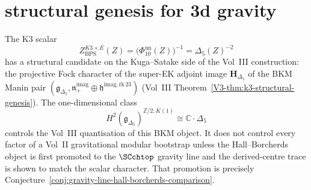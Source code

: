 \section{structural genesis for 3d gravity}
\label{sec:3dg-gelfand-supplement}

\begin{remark}
\label{rem:3dg-gelfand-phi-ek-adjoint}
The K3 scalar
\[
Z_{\mathrm{BPS}}^{K3\times E}(Z)=\bigl(\Phi_{10}^{\mathrm{un}}(Z)\bigr)^{-1}
=\Delta_5(Z)^{-2}
\]
has a structural candidate on the Kuga--Satake side of the Vol~III
construction: the projective Fock character of the super-EK adjoint
image \(\mathbf H_{\Delta_5}\) of the BKM Manin pair
\((\mathfrak{g}_{\Delta_5},
\mathfrak{n}_+^{\mathrm{imag}}\oplus
\mathfrak{h}^{\mathrm{imag,rk\,23}})\)
(Vol~III Theorem~\ref*{V3-thm:k3-structural-genesis}). The
one-dimensional class
\[
H^2(\mathfrak{g}_{\Delta_5})^{\mathbb{Z}/2,K(1)}
\cong \mathbb{C}\cdot\Delta_5
\]
controls the Vol~III quantisation of this BKM object. It does not
control every factor of a Vol~II gravitational modular bootstrap
unless the Hall--Borcherds object is first promoted to the
\(\SCchtop\) gravity line and the derived-centre trace is shown to
match the scalar character. That promotion is precisely
Conjecture~\ref{conj:gravity-line-hall-borcherds-comparison}.
\end{remark}


